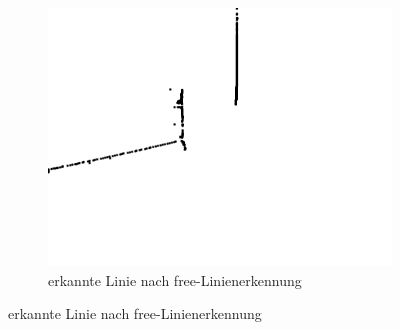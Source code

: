 \documentclass[ngerman,a4paper,parskip=half]{scrartcl}
\begin{document}
\begin{figure}[H]
\begin{subfigure}{0.32\textwidth}
		\includegraphics[width=\textwidth]{includes/green_0_free.png}
		\caption{erkannte Linie nach free-Linienerkennung}
		\label{fig:green_0_free}
	\end{subfigure}
	

\end{figure}
\end{document}
